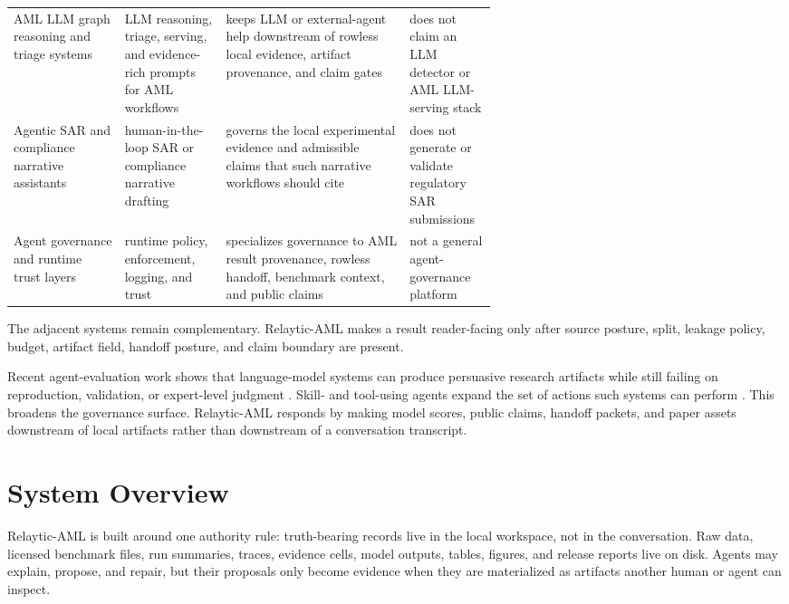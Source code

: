 \documentclass[11pt]{article}
\begin{document}
\begin{table}[p]
\begin{minipage}{\linewidth}
\begin{tabularx}{\linewidth}{@{}>{\raggedright\arraybackslash}p{0.23\linewidth} >{\raggedright\arraybackslash}p{0.21\linewidth} >{\raggedright\arraybackslash}X >{\raggedright\arraybackslash}p{0.18\linewidth}@{}}
AML LLM graph reasoning and triage systems \citep{pirmorad2025amlgraphllm,naik2026llmopsaml} & LLM reasoning, triage, serving, and evidence-rich prompts for AML workflows & keeps LLM or external-agent help downstream of rowless local evidence, artifact provenance, and claim gates & does not claim an LLM detector or AML LLM-serving stack \\
Agentic SAR and compliance narrative assistants \citep{naik2025coinvestigator} & human-in-the-loop SAR or compliance narrative drafting & governs the local experimental evidence and admissible claims that such narrative workflows should cite & does not generate or validate regulatory SAR submissions \\
Agent governance and runtime trust layers \citep{gaurav2025governanceaas,kaptein2026runtimegovernance} & runtime policy, enforcement, logging, and trust & specializes governance to AML result provenance, rowless handoff, benchmark context, and public claims & not a general agent-governance platform \\
\bottomrule
\end{tabularx}
\end{minipage}
\end{table}


The adjacent systems remain complementary. Relaytic-AML makes a result reader-facing only after source posture, split, leakage policy, budget, artifact field, handoff posture, and claim boundary are present.

Recent agent-evaluation work shows that language-model systems can produce persuasive research artifacts while still failing on reproduction, validation, or expert-level judgment \citep{chen2025mlrbench,starace2025paperbench,wijk2025rebench}. Skill- and tool-using agents expand the set of actions such systems can perform \citep{yang2026skillopt}. This broadens the governance surface. Relaytic-AML responds by making model scores, public claims, handoff packets, and paper assets downstream of local artifacts rather than downstream of a conversation transcript.

\section{System Overview}

Relaytic-AML is built around one authority rule: truth-bearing records live in the local workspace, not in the conversation. Raw data, licensed benchmark files, run summaries, traces, evidence cells, model outputs, tables, figures, and release reports live on disk. Agents may explain, propose, and repair, but their proposals only become evidence when they are materialized as artifacts another human or agent can inspect.
\end{document}
